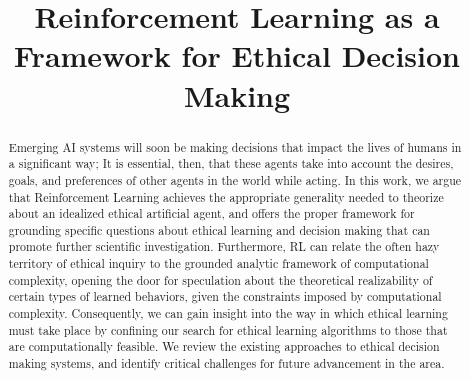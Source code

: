 \documentclass[11pt]{article}
\title{Reinforcement Learning as a Framework for Ethical Decision Making}
\author{}
\date{}                                           %
\begin{document}
\maketitle


\begin{abstract}
Emerging AI systems will soon be making decisions that impact the lives of humans in a significant way; It is essential, then, that these agents take into account the desires, goals, and preferences of other agents in the world while acting.
In this work, we argue that Reinforcement Learning achieves the appropriate generality needed to theorize about an idealized ethical artificial agent, and offers the proper framework for grounding specific questions about ethical learning and decision making that can promote further scientific investigation.
Furthermore, RL can relate the often hazy territory of ethical inquiry to the grounded analytic framework of computational complexity, opening the door for speculation about the theoretical realizability of certain types of learned behaviors, given the constraints imposed by computational complexity. Consequently, we can gain insight into the way in which ethical learning must take place by confining our search for ethical learning algorithms to those that are computationally feasible. 
We review the existing approaches to ethical decision making systems, and identify critical challenges for future advancement in the area.
\end{abstract}
\end{document}
